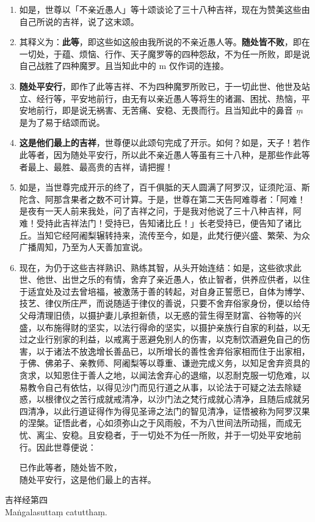 \begin{enumerate}\item 如是，世尊以「不亲近愚人」等十颂谈论了三十八种吉祥，现在为赞美这些由自己所说的吉祥，说了这末颂。
\item 其释义为：\textbf{此等}，即这些如这般由我所说的不亲近愚人等。\textbf{随处皆不败}，即在一切处，于蕴、烦恼、行作、天子魔罗等的四种怨敌，不为任一所败，即是说自己战胜了四种魔罗。且当知此中的 m 仅作词的连接。
\item \textbf{随处平安行}，即作了此等吉祥、不为四种魔罗所败已，于一切此世、他世及站立、经行等，平安地前行，由无有以亲近愚人等将生的诸漏、困扰、热恼，平安地前行，即是说无祸害、无苦痛、安稳、无畏而行。且当知此中的鼻音 \textit{ṃ} 是为了易于结颂而说。
\item \textbf{这是他们最上的吉祥}，世尊便以此颂句完成了开示。如何？如是，天子！若作此等者，因为随处平安行，所以此不亲近愚人等虽有三十八种，是那些作此等者最上、最胜、最高贵的吉祥，请把握！
\item 如是，当世尊完成开示的终了，百千俱胝的天人圆满了阿罗汉，证须陀洹、斯陀含、阿那含果者之数不可计算。于是，世尊在第二天告阿难尊者：「阿难！是夜有一天人前来我处，问了吉祥之问，于是我对他说了三十八种吉祥，阿难！受持此吉祥法门！受持已，告知诸比丘！」长老受持已，便告知了诸比丘。当知它经阿阇梨辗转持来，流传至今，如是，此梵行便兴盛、繁荣、为众广播周知，乃至为人天善加宣说。
\item 现在，为仍于这些吉祥熟识、熟练其智，从头开始连结：如是，这些欲求此世、他世、出世之乐的有情，舍弃了亲近愚人，依止智者，供养应供者，以住于适宜处及过去曾培福，被激荡于善的转起，对自身正誓愿已，自体为博学、技艺、律仪所庄严，而说随适于律仪的善说，只要不舍弃俗家身份，便以给侍父母清理旧债，以摄护妻儿承担新债，以无惑的营生得至财富、谷物等的兴盛，以布施得财的坚实，以法行得命的坚实，以摄护亲族行自家的利益，以无过之业行别家的利益，以戒离于恶避免别人的伤害，以克制饮酒避免自己的伤害，以于诸法不放逸增长善品已，以所增长的善性舍弃俗家相而住于出家相，于佛、佛弟子、亲教师、阿阇梨等以尊重、谦逊完成义务，以知足舍弃资具的贪求，以知恩住于善人之地，以闻法舍弃心的退缩，以忍耐克服一切危难，以易教令自己有依怙，以得见沙门而见行道之从事，以论法于可疑之法去除疑惑，以根律仪之苦行成就戒清净，以沙门法之梵行成就心清净，且随后成就另四清净，以此行道证得作为得见圣谛之法门的智见清净，证悟被称为阿罗汉果的涅槃。证悟此者，心如须弥山之于风雨般，不为八世间法所动摇，而成无忧、离尘、安稳。且安稳者，于一切处不为任一所败，并于一切处平安地前行。因此世尊便说：\begin{quoting}已作此等者，随处皆不败，\\随处平安行，这是他们最上的吉祥。\end{quoting}\end{enumerate}

\begin{center}\vspace{1em}吉祥经第四\\Maṅgalasuttaṃ catutthaṃ.\end{center}